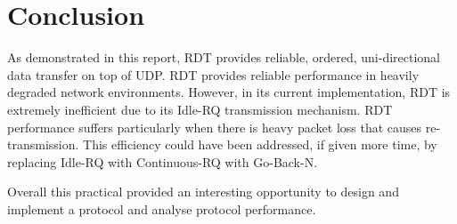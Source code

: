 \section{Conclusion}

As demonstrated in this report, RDT provides reliable, ordered, uni-directional data transfer on top of UDP. RDT provides reliable  performance in heavily degraded network environments. However, in its current implementation, RDT is extremely inefficient due to its Idle-RQ transmission mechanism. RDT performance suffers particularly when there is heavy packet loss that causes re-transmission. This efficiency could have been addressed, if given more time, by replacing Idle-RQ with Continuous-RQ with Go-Back-N.

Overall this practical provided an interesting opportunity to design and implement a protocol and analyse protocol performance.